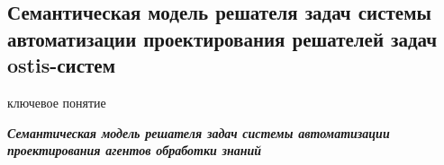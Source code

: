 \subsection{Семантическая модель решателя задач системы автоматизации проектирования решателей задач ostis-систем}
\begin{SCn}
\bigskip

\begin{scnrelfromlist}{ключевое понятие}
\end{scnrelfromlist}

\bigskip
\end{SCn}
\label{sub_sec_ps_ps_des_auto_sys}
\textit{\textbf{Семантическая модель решателя задач системы автоматизации проектирования агентов обработки знаний}}

